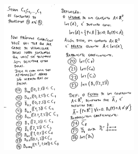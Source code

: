\documentclass[oneside,12pt]{article}
\begin{document}
\newpage

\includegraphics[height=8cm]{2020-1-C3/topo3.pdf}
\end{document}
